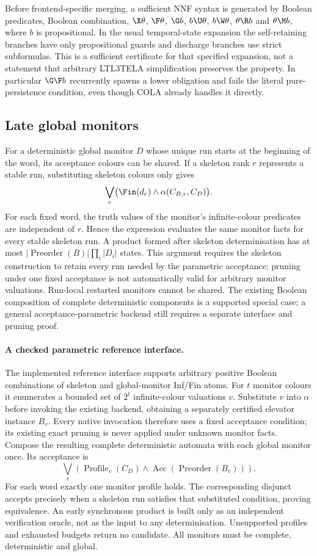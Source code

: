 Before frontend-specific merging, a sufficient NNF syntax is generated by
Boolean predicates, Boolean combination, $\X\theta$, $\F\theta$,
$\G b$, $b\U\theta$, $b\W\theta$, $\theta\R b$ and $\theta\M b$,
where $b$ is propositional. In the usual temporal-state expansion the
self-retaining branches have only propositional guards and discharge
branches use strict subformulas. This is a sufficient certificate for that
specified expansion, not a statement that arbitrary LTL3TELA simplification
preserves the property. In particular $\G\F b$ recurrently spawns a lower
obligation and fails the literal pure-persistence condition, even though
COLA already handles it directly.

\subsection{Late global monitors}
For a deterministic global monitor $D$ whose unique run starts at the
beginning of the word, its acceptance colours can be shared. If a skeleton
rank $r$ represents a stable run, substituting skeleton colours only gives
\[
 \bigvee_r\bigl(\Fin(d_r)\land
       \alpha(C_{B,r},C_D)\bigr).
\]
For each fixed word, the truth values of the monitor's infinite-colour
predicates are independent of $r$. Hence the expression evaluates the
same monitor facts for every stable skeleton run. A product formed after
skeleton determinisation has at most
$|\operatorname{Preorder}(B)|\prod_i|D_i|$ states. This argument requires
the skeleton construction to retain every run needed by the parametric
acceptance; pruning under one fixed acceptance is not automatically valid
for arbitrary monitor valuations. Run-local restarted monitors cannot be
shared. The existing Boolean composition of complete deterministic
components is a supported special case; a general acceptance-parametric
backend still requires a separate interface and pruning proof.

\paragraph{A checked parametric reference interface.}
The implemented reference interface supports arbitrary positive Boolean
combinations of skeleton and global-monitor Inf/Fin atoms. For $t$
monitor colours it enumerates a bounded set of $2^t$ infinite-colour
valuations $v$. Substitute $v$ into $\alpha$ before invoking the existing
backend, obtaining a separately certified elevator instance $B_v$.
Every native invocation therefore uses a fixed acceptance condition;
its existing exact pruning is never applied under unknown monitor facts.
Compose the resulting complete deterministic automata with each global
monitor once. Its acceptance is
\[
 \bigvee_v\left(\operatorname{Profile}_v(C_D)
                     \land\operatorname{Acc}(\operatorname{Preorder}(B_v))\right).
\]
For each word exactly one monitor profile holds. The corresponding
disjunct accepts precisely when a skeleton run satisfies that substituted
condition, proving equivalence. An early synchronous product is built
only as an independent verification oracle, not as the input to any
determinisation. Unsupported profiles and exhausted budgets return no
candidate. All monitors must be complete, deterministic and global.

